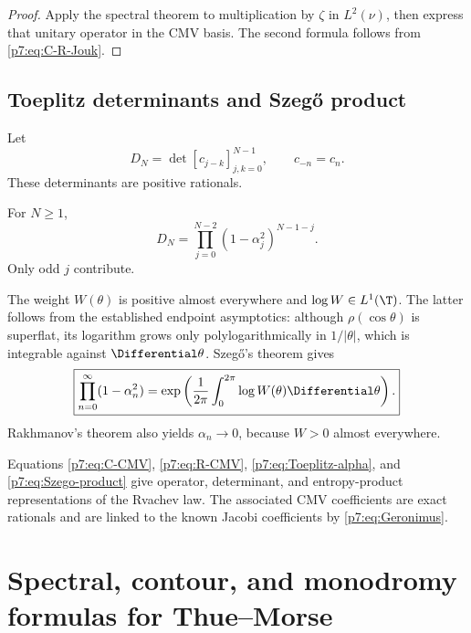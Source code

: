 \documentclass[11pt]{article}
\theoremstyle{definition}
\theoremstyle{remark}
\begin{document}
\begin{proof}
Apply the spectral theorem to multiplication by \(\zeta\) in \(L^2(\nu)\), then express that
unitary operator in the CMV basis. The second formula follows from
\eqref{p7:eq:C-R-Jouk}.
\end{proof}

\subsection{Toeplitz determinants and Szeg\H{o} product}

Let
\begin{equation}
 D_N=\det[c_{j-k}]_{j,k=0}^{N-1},\qquad c_{-n}=c_n.
 \label{p7:eq:Toeplitz-D}
\end{equation}
These determinants are positive rationals.

\begin{proposition}
\label{p7:prop:Toeplitz-product}
For \(N\ge1\),
\begin{equation}
 D_N=\prod_{j=0}^{N-2}(1-\alpha_j^2)^{N-1-j}.
 \label{p7:eq:Toeplitz-alpha}
\end{equation}
Only odd \(j\) contribute.
\end{proposition}

The weight \(W(\theta)\) is positive almost everywhere and
\(\log W\in L^1(\T)\). The latter follows from the established endpoint asymptotics:
although \(\rho(\cos\theta)\) is superflat, its logarithm grows only polylogarithmically in
\(1/|\theta|\), which is integrable against \(\Differential\theta\). Szeg\H{o}'s theorem gives
\begin{equation}
 \boxed{\displaystyle
 \prod_{n=0}^{\infty}(1-\alpha_n^2)
 =\exp\left(\frac1{2\pi}\int_0^{2\pi}\log W(\theta)\Differential\theta\right).}
 \label{p7:eq:Szego-product}
\end{equation}
Rakhmanov's theorem also yields \(\alpha_n\to0\), because \(W>0\) almost everywhere.

\begin{novelbox}
Equations \eqref{p7:eq:C-CMV}, \eqref{p7:eq:R-CMV}, \eqref{p7:eq:Toeplitz-alpha}, and
\eqref{p7:eq:Szego-product} give operator, determinant, and entropy-product representations of
the Rvachev law. The associated CMV coefficients are exact rationals and are linked to the
known Jacobi coefficients by \eqref{p7:eq:Geronimus}.
\end{novelbox}

\section{Spectral, contour, and monodromy formulas for Thue--Morse}
\label{p7:sec:TM}
\end{document}
